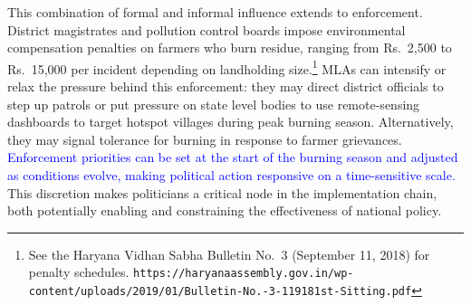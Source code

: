 \documentclass[12pt]{article}
\providecommand{\textt}[1]{\texttt{#1}}
\begin{document}
This combination of formal and informal influence extends to enforcement. District magistrates and pollution control boards impose environmental compensation penalties on farmers who burn residue, ranging from Rs.~2,500 to Rs.~15,000 per incident depending on landholding size.\footnote{See the Haryana Vidhan Sabha Bulletin No.\ 3 (September 11, 2018) for penalty schedules. \textt{https://haryanaassembly.gov.in/wp-content/uploads/2019/01/Bulletin-No.-3-119181st-Sitting.pdf}} MLAs can intensify or relax the pressure behind this enforcement: they may direct district officials to step up patrols or put pressure on state level bodies to use remote-sensing dashboards to target hotspot villages during peak burning season. Alternatively, they may signal tolerance for burning in response to farmer grievances. \textcolor{blue}{Enforcement priorities can be set at the start of the burning season and adjusted as conditions evolve, making political action responsive on a time-sensitive scale.}
This discretion makes politicians a critical node in the implementation chain, both potentially enabling and constraining the effectiveness of national policy.
 
 
\end{document}
